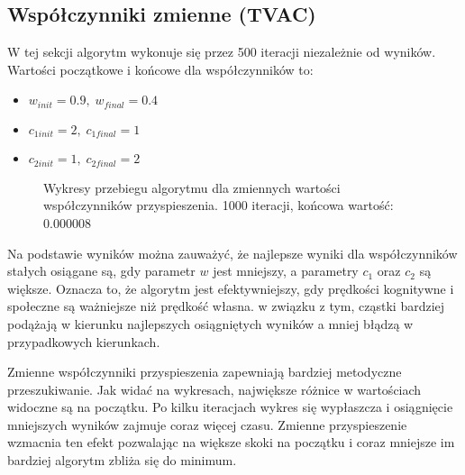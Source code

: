 \documentclass[12pt]{article}
\begin{document}
\subsection{Współczynniki zmienne (TVAC)}
W tej sekcji algorytm wykonuje się przez 500 iteracji niezależnie od wyników. Wartości początkowe i końcowe dla współczynników to:
\begin{itemize}
    \item $w_{init} = 0.9,\; w_{final} = 0.4$
    \item $c_{1init} = 2,\; c_{1final} = 1$
    \item $c_{2init} = 1,\; c_{2final} = 2$
\end{itemize}
\begin{figure}[H]
    \centering
    \begin{adjustbox}{width=0.6\linewidth}
\end{adjustbox}
    \caption{Wykresy przebiegu algorytmu dla zmiennych wartości współczynników przyspieszenia. 1000 iteracji, końcowa wartość: 0.000008}
\end{figure}

Na podstawie wyników można zauważyć, że najlepsze wyniki dla współczynników stałych osiągane są, gdy parametr $w$ jest mniejszy, a parametry $c_1$ oraz $c_2$ są większe. Oznacza to, że algorytm jest efektywniejszy, gdy prędkości kognitywne i społeczne są ważniejsze niż prędkość własna. w związku z tym, cząstki bardziej podążają w kierunku najlepszych osiągniętych wyników a mniej błądzą w przypadkowych kierunkach.

Zmienne współczynniki przyspieszenia zapewniają bardziej metodyczne przeszukiwanie. Jak widać na wykresach, największe różnice w wartościach widoczne są na początku. Po kilku iteracjach wykres się wypłaszcza i osiągnięcie mniejszych wyników zajmuje coraz więcej czasu. Zmienne przyspieszenie wzmacnia ten efekt pozwalając na większe skoki na początku i coraz mniejsze im bardziej algorytm zbliża się do minimum.
\end{document}
